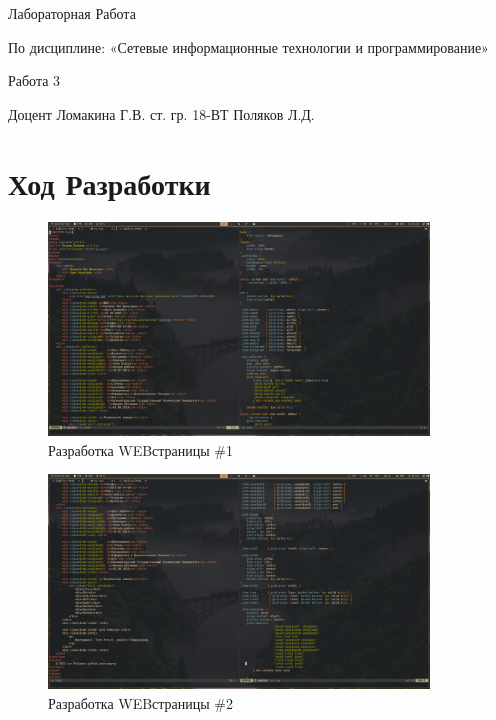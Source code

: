\documentclass[14pt]{extarticle}
\let\oldsection\section
\renewcommand\section{\clearpage\oldsection}
\begin{document}
\unititle
{\klgtu}
{\fapu}
{\suvt}
{Лабораторная Работа}
{По дисциплине: «Сетевые информационные технологии и программирование» \par Работа 3}
{Доцент}
{Ломакина Г.В.}
{ст. гр. 18-ВТ}
{Поляков Л.Д.}

\tableofcontents


\section{Ход Разработки}

\begin{figure}[h]
    \centering
	\includegraphics[width=0.9\textwidth, angle=0]{2021-12-12-16-25-27.png}
    \caption{Разработка WEB\-страницы \#1}
    \label{fig:html1}
\end{figure}

\begin{figure}[h]
    \centering
	\includegraphics[width=0.9\textwidth, angle=0]{ 2021-12-12-16-25-50.png }
    \caption{Разработка WEB\-страницы \#2}
    \label{fig:html2}
\end{figure}
\end{document}
